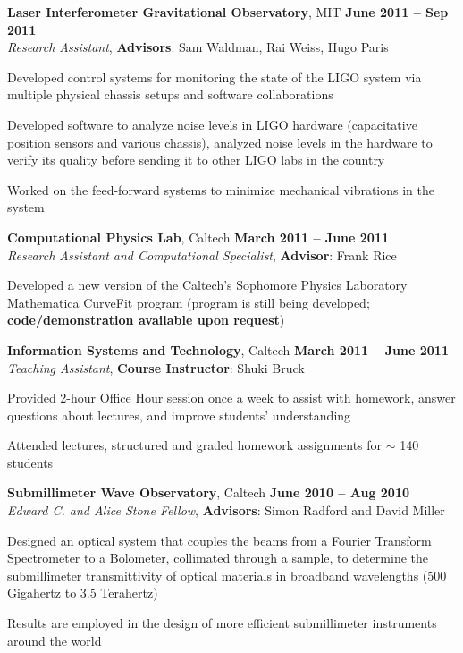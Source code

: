 \documentclass[margin,line]{resume}
\begin{document}
\begin{resume}
\textbf{Laser Interferometer Gravitational Observatory}, MIT \hfill \textbf{June 2011 -- Sep 2011}\\
\textsl{Research Assistant}, \textbf{Advisors}: Sam Waldman, Rai Weiss, Hugo Paris
\begin{list2}
  \item Developed control systems for monitoring the state of the LIGO system via multiple physical chassis setups and software collaborations
  \item Developed software to analyze noise levels in LIGO hardware (capacitative position sensors and various chassis), analyzed noise levels in the hardware to verify its quality before sending it to other LIGO labs in the country
  \item Worked on the feed-forward systems to minimize mechanical vibrations in the system
\end{list2}

\textbf{Computational Physics Lab}, Caltech \hfill \textbf{March 2011 -- June 2011}\\
\textsl{Research Assistant and Computational Specialist}, \textbf{Advisor}: Frank Rice
\begin{list2}
  \item Developed a new version of the Caltech's Sophomore Physics Laboratory Mathematica CurveFit program (program is still being developed; \textbf{code/demonstration available upon request})
\end{list2}

\textbf{Information Systems and Technology}, Caltech \hfill \textbf{March 2011 -- June 2011}\\
\textsl{Teaching Assistant}, \textbf{Course Instructor}: Shuki Bruck
\begin{list2}
  \item Provided 2-hour Office Hour session once a week to assist with homework, answer questions about lectures, and improve students' understanding
  \item Attended lectures, structured and graded homework assignments for $\sim$ 140 students
\end{list2}

\textbf{Submillimeter Wave Observatory}, Caltech \hfill \textbf{June 2010 -- Aug 2010}\\
\textsl{Edward C. and Alice Stone Fellow}, \textbf{Advisors}: Simon Radford and David Miller
\begin{list2}
  \item Designed an optical system that couples the beams from a Fourier Transform Spectrometer to a Bolometer, collimated through a sample, to determine the submillimeter transmittivity of optical materials in broadband wavelengths (500 Gigahertz to 3.5 Terahertz)
  \item Results are employed in the design of more efficient submillimeter instruments around the world
\end{list2}


\end{resume}
\end{document}
